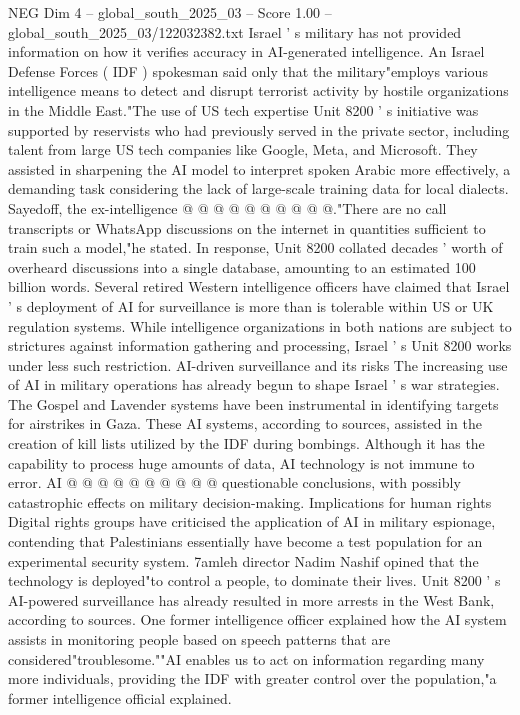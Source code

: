 \begin{textsample}{NEG Dim 4 – global\_south\_2025\_03 – Score 1.00 – global\_south\_2025\_03/122032382.txt}
Israel ' s military has not provided information on how it verifies accuracy in AI-generated intelligence.
An Israel Defense Forces ( IDF ) spokesman said only that the military"employs various intelligence means to detect and disrupt terrorist activity by hostile organizations in the Middle East."The use of US tech expertise Unit 8200 ' s initiative was supported by reservists who had previously served in the private sector, including talent from large US tech companies like Google, Meta, and Microsoft.
They assisted in sharpening the AI model to interpret spoken Arabic more effectively, a demanding task considering the lack of large-scale training data for local dialects.
Sayedoff, the ex-intelligence @ @ @ @ @ @ @ @ @ @."There are no call transcripts or WhatsApp discussions on the internet in quantities sufficient to train such a model,"he stated.
In response, Unit 8200 collated decades ' worth of overheard discussions into a single database, amounting to an estimated 100 billion words.
Several retired Western intelligence officers have claimed that Israel ' s deployment of AI for surveillance is more than is tolerable within US or UK regulation systems.
While intelligence organizations in both nations are subject to strictures against information gathering and processing, Israel ' s Unit 8200 works under less such restriction.
AI-driven surveillance and its risks The increasing use of AI in military operations has already begun to shape Israel ' s war strategies.
The Gospel and Lavender systems have been instrumental in identifying targets for airstrikes in Gaza.
These AI systems, according to sources, assisted in the creation of kill lists utilized by the IDF during bombings.
Although it has the capability to process huge amounts of data, AI technology is not immune to error.
AI @ @ @ @ @ @ @ @ @ @ questionable conclusions, with possibly catastrophic effects on military decision-making.
Implications for human rights Digital rights groups have criticised the application of AI in military espionage, contending that Palestinians essentially have become a test population for an experimental security system. 7amleh director Nadim Nashif opined that the technology is deployed"to control a people, to dominate their lives.
Unit 8200 ' s AI-powered surveillance has already resulted in more arrests in the West Bank, according to sources.
One former intelligence officer explained how the AI system assists in monitoring people based on speech patterns that are considered"troublesome.""AI enables us to act on information regarding many more individuals, providing the IDF with greater control over the population,"a former intelligence official explained.

\end{textsample}
